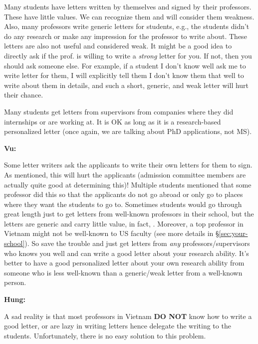 \documentclass[oneside,11pt]{memoir}
\newenvironment{commentbox}[1][]{
\small
    \begin{mybox}
    {\small \textbf{#1}}
 }{
   \end{mybox}
}
\newcommand{\red}[1]{{\color{red}{#1}}}
\begin{document}
Many students have letters written by themselves and signed by their professors. These have little
values. We can recognize them and will consider them weakness.
Also, many professors write generic letters for students, e.g., the students didn't do any
research or make any impression for the professor to write about. These letters are also not useful and considered weak.  It might be a good idea to directly ask if the prof. is willing to write a \emph{strong} letter for you. If not, then you should ask someone else.  For example, if a student I don't know well ask me to write letter for them, I will explicitly tell them I don't know them that well to write about them in details, and such a short, generic, and weak letter will hurt their chance.

Many students get letters from supervisors from companies where they did internships or are working at. It is OK as long as it is a research-based personalized letter (once again, we are talking about PhD applications, not MS).

\begin{commentbox}[Vu:]
Some letter writers ask the applicants to write their own letters for them to sign. As mentioned, this will hurt the applicants (admission committee members are actually quite good at determining this)! Multiple students mentioned that  some professor did this so that the applicants do not go abroad or only go to places where they want the students to go to.
\tcblower
Sometimes students would go through great length just to get letters from well-known professors in their school, but the letters are generic and carry little value, in fact, \red{red flags}. Moreover, a top professor in Vietnam might not be well-known to US faculty (see more details in \S\ref{sec:your-school}). So save the trouble and just get letters from \emph{any} professors/supervisors who knows you well and can write a good letter about your research ability. It's better to have a good personalized
letter about your own research ability from someone who is less
well-known than a generic/weak letter from a well-known person.
\end{commentbox}

\begin{commentbox}[Hung:]
A sad reality is that most professors in Vietnam \textbf{DO NOT} know how to write a good letter, or are lazy in writing letters hence delegate the writing to the students. Unfortunately, there is no easy solution to this problem.
\end{commentbox}
\end{document}
